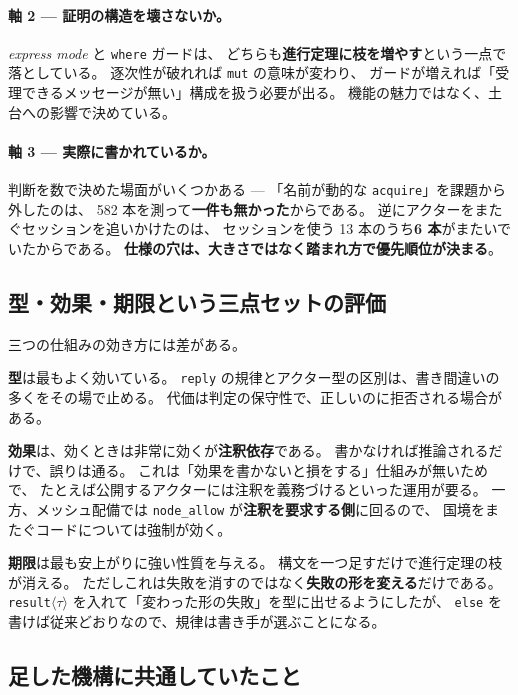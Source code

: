 \documentclass[11pt,a4paper]{ltjsarticle}
\theoremstyle{definition}
\theoremstyle{remark}
\begin{document}
\paragraph{軸 2 --- 証明の構造を壊さないか。}
\textit{express mode} と \texttt{where} ガードは、
どちらも\textbf{進行定理に枝を増やす}という一点で落としている。
逐次性が破れれば \texttt{mut} の意味が変わり、
ガードが増えれば「受理できるメッセージが無い」構成を扱う必要が出る。
機能の魅力ではなく、土台への影響で決めている。

\paragraph{軸 3 --- 実際に書かれているか。}
判断を数で決めた場面がいくつかある ---
「名前が動的な \texttt{acquire}」を課題から外したのは、
582 本を測って\textbf{一件も無かった}からである。
逆にアクターをまたぐセッションを追いかけたのは、
セッションを使う 13 本のうち\textbf{6 本}がまたいでいたからである。
\textbf{仕様の穴は、大きさではなく踏まれ方で優先順位が決まる}。

\subsection{型・効果・期限という三点セットの評価}

三つの仕組みの効き方には差がある。

\textbf{型}は最もよく効いている。
\texttt{reply} の規律とアクター型の区別は、書き間違いの多くをその場で止める。
代価は判定の保守性で、正しいのに拒否される場合がある。

\textbf{効果}は、効くときは非常に効くが\textbf{注釈依存}である。
書かなければ推論されるだけで、誤りは通る。
これは「効果を書かないと損をする」仕組みが無いためで、
たとえば公開するアクターには注釈を義務づけるといった運用が要る。
一方、メッシュ配備では \texttt{node\_allow} が\textbf{注釈を要求する側}に回るので、
国境をまたぐコードについては強制が効く。

\textbf{期限}は最も安上がりに強い性質を与える。
構文を一つ足すだけで進行定理の枝が消える。
ただしこれは失敗を消すのではなく\textbf{失敗の形を変える}だけである。
\texttt{result}$\langle\tau\rangle$ を入れて「変わった形の失敗」を型に出せるようにしたが、
\texttt{else} を書けば従来どおりなので、規律は書き手が選ぶことになる。

\subsection{足した機構に共通していたこと}
\end{document}
